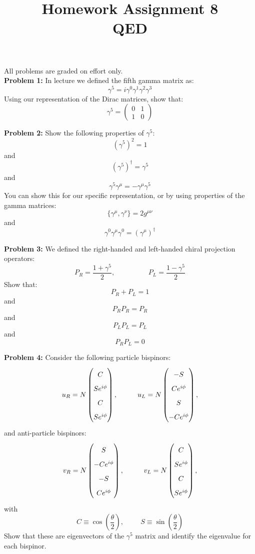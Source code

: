 \documentclass[12pt]{article}
\begin{document}
\title{Homework Assignment 8 \\ QED }

\maketitle

\noindent
All problems are graded on effort only.\\

\noindent
{\bf Problem 1:}  In lecture we defined the fifth gamma matrix as:
$$\gamma^5 = i \gamma^0 \gamma^1 \gamma^2 \gamma^3$$
Using our representation of the Dirac matrices, show that:
$$\gamma^5 = \begin{pmatrix} 0 & 1 \\ 1 & 0 \end{pmatrix}$$


\noindent
{\bf Problem 2:}  Show the following properties of $\gamma^5$:
$$(\gamma^5)^2 = 1$$
and
$$(\gamma^5)^\dagger = \gamma^5$$
and
$$\gamma^5 \gamma^\mu = -\gamma^\mu \gamma^5$$
You can show this for our specific representation, or by using properties of the gamma matrices:
$$\{ \gamma^\mu, \gamma^\nu \} = 2 g^{\mu \nu}$$
and
$$\gamma^0 \gamma^\mu \gamma^0 = (\gamma^\mu)^\dagger$$

\noindent
{\bf Problem 3:}  We defined the right-handed and left-handed chiral projection operators:
$$P_R = \frac{1+\gamma^5}{2}, \hspace{2cm} P_L = \frac{1-\gamma^5}{2}$$
Show that:
$$P_R + P_L = 1$$
and
$$P_R P_R = P_R$$
and
$$P_L P_L = P_L$$
and
$$P_R P_L = 0$$

\noindent
{\bf Problem 4:}  Consider the following particle bispinors:
$$\def\arraystretch{1.7}
u_R = N \begin{pmatrix} C  \\ S e^{i\phi} \\ C \\ S e^{i\phi} \end{pmatrix}, \hspace{1cm}
u_L = N \begin{pmatrix} -S \\ C e^{i\phi} \\ S \\ -C e^{i\phi} \end{pmatrix},
$$
and anti-particle bispinors:
$$\def\arraystretch{1.7}
v_R = N \begin{pmatrix} S \\ -C e^{i\phi} \\ -S \\ C e^{i\phi} \end{pmatrix}, \hspace{1cm}
v_L = N \begin{pmatrix} C \\  S e^{i\phi} \\  C \\ S e^{i\phi} \end{pmatrix},
$$
with
$$C \equiv \cos \left( \frac{\theta}{2} \right), \hspace{1cm } S \equiv \sin \left( \frac{\theta}{2} \right)$$
Show that these are eigenvectors of the $\gamma^5$ matrix and identify the eigenvalue for each bispinor.\\[5pt]
\end{document}
